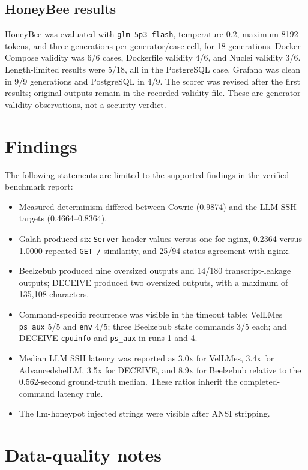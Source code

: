 \documentclass[a4paper,11pt]{article}
\begin{document}
\subsection{HoneyBee results}

HoneyBee was evaluated with \texttt{glm-5p3-flash}, temperature 0.2, maximum
8192 tokens, and three generations per generator/case cell, for 18
generations. Docker Compose validity was 6/6 cases, Dockerfile validity 4/6,
and Nuclei validity 3/6. Length-limited results were 5/18, all in the
PostgreSQL case. Grafana was clean in 9/9 generations and PostgreSQL in 4/9.
The scorer was revised after the first results; original outputs remain in the
recorded validity file. These are generator-validity observations, not a
security verdict.

\section{Findings}

The following statements are limited to the supported findings in the
verified benchmark report:

\begin{itemize}[leftmargin=*]
\item Measured determinism differed between Cowrie (0.9874) and the LLM SSH
targets (0.4664--0.8364).
\item Galah produced six \texttt{Server} header values versus one for nginx,
0.2364 versus 1.0000 repeated-\texttt{GET /} similarity, and 25/94 status
agreement with nginx.
\item Beelzebub produced nine oversized outputs and 14/180 transcript-leakage
outputs; DECEIVE produced two oversized outputs, with a maximum of 135,108
characters.
\item Command-specific recurrence was visible in the timeout table: VelLMes
\texttt{ps\_aux} 5/5 and \texttt{env} 4/5; three Beelzebub state commands
3/5 each; and DECEIVE \texttt{cpuinfo} and \texttt{ps\_aux} in runs 1 and 4.
\item Median LLM SSH latency was reported as 3.0x for VelLMes, 3.4x for
AdvancedshelLM, 3.5x for DECEIVE, and 8.9x for Beelzebub relative to the
0.562-second ground-truth median. These ratios inherit the completed-command
latency rule.
\item The llm-honeypot injected strings were visible after ANSI stripping.
\end{itemize}

\section{Data-quality notes}
\end{document}
